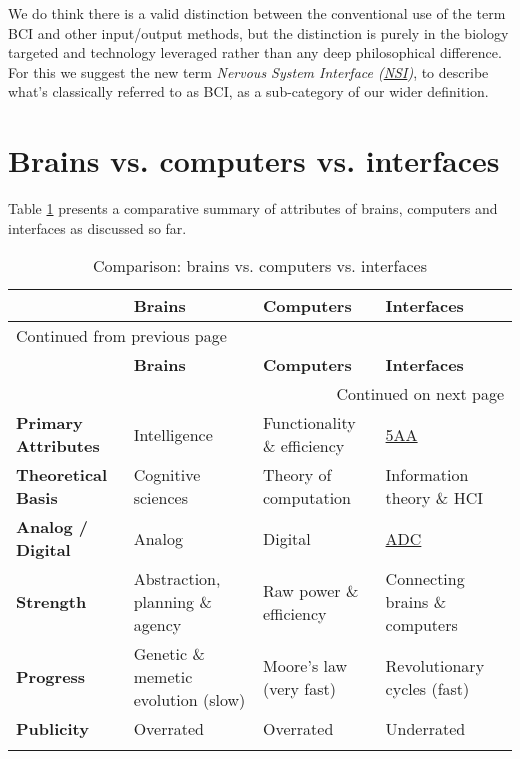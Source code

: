 \documentclass[logo,bsc,singlespacing,parskip]{infthesis}
\begin{document}
We do think there is a valid distinction between the conventional use of the term BCI and other input/output methods, but the distinction is purely in the biology targeted and technology leveraged rather than any deep philosophical difference.
For this we suggest the new term \emph{Nervous System Interface (\hyperref[orgf403bf3]{NSI})}, to describe what's classically referred to as BCI, as a sub-category of our wider definition.

\section{Brains vs. computers vs. interfaces}
\label{sec:org729f1d4}
Table \ref{tab:b_vs_c_vs_i} presents a comparative summary of attributes of brains, computers and interfaces as discussed so far.
{\small %
{\renewcommand{\arraystretch}{1.2} %
\begin{longtable}{|p{1.8cm}|p{3.0cm}|p{3.0cm}|p{3.0cm}|}
\hline
 & \textbf{Brains} & \textbf{Computers} & \textbf{Interfaces}\\
\hline
\endfirsthead
\multicolumn{4}{l}{Continued from previous page} \\
\hline

 & \textbf{Brains} & \textbf{Computers} & \textbf{Interfaces} \\

\hline
\endhead
\hline\multicolumn{4}{r}{Continued on next page} \\
\endfoot
\endlastfoot
\hline
\textbf{Primary Attributes} & Intelligence & Functionality \& efficiency & \hyperref[org2644eb5]{5AA}\\
\hline
\textbf{Theoretical Basis} & Cognitive sciences & Theory of computation & Information theory \& HCI\\
\hline
\textbf{Analog / Digital} & Analog & Digital & \hyperref[org44fccbb]{ADC}\footnotemark\\
\hline
\textbf{Strength} & Abstraction, planning \& agency & Raw power \& efficiency & Connecting brains \& computers\\
\hline
\textbf{Progress} & Genetic \& memetic evolution (slow) & Moore's law (very fast) & Revolutionary cycles (fast)\\
\hline
\textbf{Publicity} & Overrated & Overrated & Underrated\\
\hline
\caption{\label{tab:b_vs_c_vs_i}Comparison: brains vs. computers vs. interfaces}
\\
\end{longtable}
}
}
\end{document}
